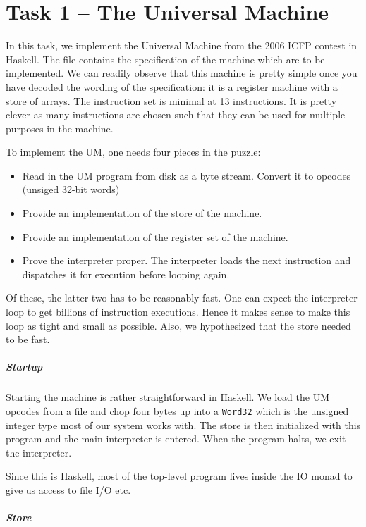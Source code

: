 \chapter{Task 1 -- The Universal Machine}
\label{chap:task+1}

In this task, we implement the Universal Machine from the 2006 ICFP
contest in Haskell. The file \cite{um+spec} contains the specification
of the machine which are to be implemented. We can readily observe
that this machine is pretty simple once you have decoded the wording
of the specification: it is a register machine with a store of
arrays. The instruction set is minimal at 13 instructions. It is pretty
clever as many instructions are chosen such that they can be used for
multiple purposes in the machine.

To implement the UM, one needs four pieces in the puzzle:
\begin{itemize}
\item Read in the UM program from disk as a byte stream. Convert it to
  opcodes (unsiged 32-bit words)
\item Provide an implementation of the store of the machine.
\item Provide an implementation of the register set of the machine.
\item Prove the interpreter proper. The interpreter loads the next
  instruction and dispatches it for execution before looping again.
\end{itemize}
Of these, the latter two has to be reasonably fast. One can expect the
interpreter loop to get billions of instruction executions. Hence it
makes sense to make this loop as tight and small as possible. Also, we
hypothesized that the store needed to be fast.

\paragraph{Startup}
\label{sec:startup}

Starting the machine is rather straightforward in Haskell. We load the
UM opcodes from a file and chop four bytes up into a \texttt{Word32}
which is the unsigned integer type most of our system works with. The
store is then initialized with this program and the main interpreter
is entered. When the program halts, we exit the interpreter.

Since this is Haskell, most of the top-level program lives inside the
IO monad to give us access to file I/O etc.

\paragraph{Store}
\label{sec:store}

